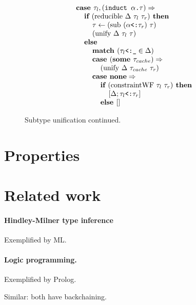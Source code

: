 \documentclass[acmsmall]{acmart}
\begin{document}
\begin{figure*}[h]
\[\begin{array}[t]{@{} l}
    \\

    \I \B{case } \tau_l, (\code{induct $\alpha$.$\tau$}) \Rightarrow
    \\
    \I\I \B{if } (\F{reducible } \Delta\ \tau_l\ \tau_r) \B{ then }
    \\
    \I\I\I \tau \leftarrow (\text{sub } (\code{$\alpha$<:$\tau_r$})\ \tau) 
    \\
    \I\I\I (\F{unify } \Delta\ \tau_l\ \tau)
    \\
    \I\I \B{else }
    \\
    \I\I\I \B{match } (\code{$\tau_l$<:\_} \in \Delta)
    \\
    \I\I\I \B{case } (\B{some } \tau_{cache}) \Rightarrow
    \\
    \I\I\I\I (\F{unify } \Delta\ \tau_{cache}\ \tau_r)
    \\
    \I\I\I \B{case } \B{none} \Rightarrow
    \\
    \I\I\I\I \B{if } (\F{constraintWF } \tau_l\ \tau_r) \B{ then }
    \\
    \I\I\I\I\I [\Delta;\code{$\tau_l$<:$\tau_r$}]
    \\
    \I\I\I\I \B{else } [] 

\end{array}
\]

\caption{Subtype unification continued.}
\end{figure*}



\section{Properties}

\section{Related work}

\paragraph{Hindley-Milner type inference}
Exemplified by ML.

\paragraph{Logic programming.}
Exemplified by Prolog. 

Similar: both have backchaining. 
\end{document}
